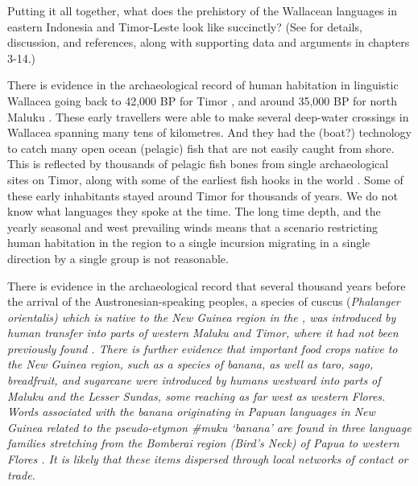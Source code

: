 Putting it all together,
what does the prehistory of the Wallacean languages in eastern
Indonesia and Timor-Leste look like succinctly? (See  for
details, discussion, and references, along with supporting data
and arguments in chapters 3-14.)

There is evidence in the archaeological record of human habitation
in linguistic Wallacea going back to 42,000 BP for Timor \citep{OConnor2015},
and around 35,000 BP for north Maluku \citep{Bellwood2019a}.
These early travellers were able to make several deep-water crossings
in Wallacea spanning many tens of kilometres.
And they had the (boat?) technology to catch many open ocean
(pelagic) fish that are not easily caught from shore.
This is reflected by thousands of pelagic fish bones from single
archaeological sites on Timor,
along with some of the earliest fish hooks in the world \citep{OConnor2015}.
Some of these early inhabitants stayed around Timor for thousands of years.
We do not know what languages they spoke at the time.
The long time depth,
and the yearly seasonal 
and west prevailing winds means that a scenario restricting human
habitation in the region to a single incursion migrating in a
single direction by a single group is not reasonable.

\largerpage
There is evidence in the archaeological record that several thousand
years before the arrival of the Austronesian-speaking peoples,
a species of cuscus (\it{Phalanger orientalis}) which is native
to the New Guinea region in the ,
was introduced by human transfer into parts of western Maluku
and Timor, where it had not been previously found \citep{FlanneryNitihaminoto1995,Schapper2011}.
There is further evidence that important food crops native to
the New Guinea region,
such as a species of banana,
as well as taro,
sago, breadfruit, and sugarcane were introduced by humans westward
into parts of Maluku
and the Lesser Sundas,
some reaching as far west as western Flores.
Words associated with the banana originating in Papuan languages
in New Guinea related to the pseudo-etymon {\#}muku ‘banana’
are found in three language families stretching from the Bomberai
region (Bird’s Neck) of Papua to western Flores
\citep{DenhamDonohue2009,DonohueDenham2009,DonohueDenham2010,UsherSchapper2022}.
It is likely that these items dispersed through local networks
of contact or trade.

